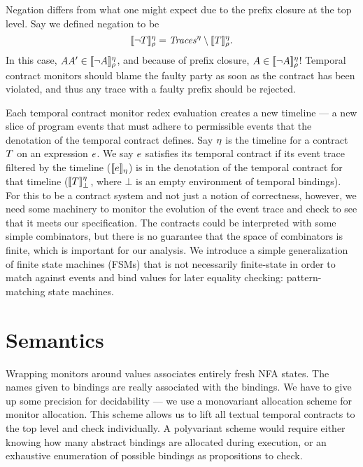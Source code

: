 Negation differs from what one might expect due to the prefix closure at the top level.
%
Say we defined negation to be
\begin{equation*}
  [\![ \neg T ]\!]^{\eta}_{\rho} = \mathit{Traces}^\eta \setminus [\![ T ]\!]^{\eta}_{\rho}\text.
\end{equation*}
In this case, $AA' \in [\![ \neg A ]\!]^{\eta}_{\rho}$, and because of prefix closure, $A \in [\![ \neg A ]\!]^{\eta}_{\rho}$!
%
Temporal contract monitors should blame the faulty party as soon as the contract has been violated, and thus any trace with a faulty prefix should be rejected.

Each temporal contract monitor redex evaluation creates a new timeline --- a new slice of program events that must adhere to permissible events that the denotation of the temporal contract defines.
%
Say $\eta$ is the timeline for a contract $T$ on an expression $e$.
%
We say $e$ satisfies its temporal contract if its event trace filtered by the timeline ($[\![ e ]\!]_\eta$) is in the denotation of the temporal contract for that timeline ($[\![ T ]\!]^{\eta}_{\bot}$, where $\bot$ is an empty environment of temporal bindings).
%
For this to be a contract system and not just a notion of correctness, however, we need some machinery to monitor the evolution of the event trace and check to see that it meets our specification.
%
The contracts could be interpreted with some simple combinators, but there is no guarantee that the space of combinators is finite, which is important for our analysis.
%
We introduce a simple generalization of finite state machines (FSMs) that is not necessarily finite-state in order to match against events and bind values for later equality checking: pattern-matching state machines.

\section{Semantics}\label{sec:technical}

Wrapping monitors around values associates entirely fresh NFA states.
%
The names given to bindings are really associated with the bindings.
%
We have to give up some precision for decidability --- we use a monovariant allocation scheme for monitor allocation.
%
This scheme allows us to lift all textual temporal contracts to the top level and check individually.
%
A polyvariant scheme would require either knowing how many abstract bindings are allocated during execution, or an exhaustive enumeration of possible bindings as propositions to check.

